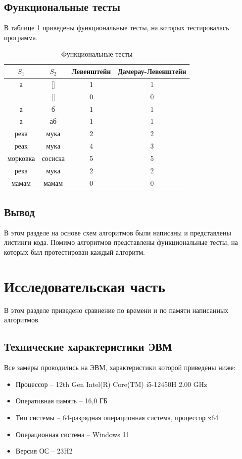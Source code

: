 \documentclass{article}
\begin{document}
\clearpage\subsection{Функциональные тесты}
В таблице \ref{tbl:func_test} приведены функциональные тесты, на которых тестировалась программа.
\begin{table}[h]
	\begin{center}
	\caption{\label{tbl:func_test} Функциональные тесты}
	\begin{tabular}{|c|c|c|c|}
		\hline
		$S_{1}$ & $S_{2}$ & Левенштейн &  Дамерау-Левенштейн
		\\ \hline
		а & [] & 1 & 1  
		\\ \hline
		[] & [] & 0 & 0                             
		\\ \hline
		а & б & 1 & 1 
		\\ \hline
		а & аб & 1 & 1 
		\\ \hline
		река & мука & 2 & 2 
		\\ \hline
		реак & мука & 4 & 3 
		\\ \hline
		морковка & сосиска & 5 & 5 
		\\ \hline
		река & мука & 2 & 2 
		\\ \hline
		мамам & мамам & 0 & 0 
		\\ \hline
	\end{tabular}
	\end{center}
\end{table}

\subsection{Вывод}
В этом разделе на основе схем алгоритмов были написаны и представлены листинги кода. Помимо алгоритмов
представлены функциональные тесты, на которых был протестирован каждый алгоритм.


\clearpage\section{Исследовательская часть}
В этом разделе приведено сравнение по времени и по памяти написанных алгоритмов.

\subsection{Технические характеристики ЭВМ}
Все замеры проводились на ЭВМ, характеристики которой приведены ниже:
\begin{itemize}
	\item Процессор -- 12th Gen Intel(R) Core(TM) i5-12450H   2.00 GHz
	\item Оперативная память -- 16,0 ГБ
	\item Тип системы -- 64-разрядная операционная система, процессор x64
	\item Операционная система -- Windows 11
	\item Версия ОС -- 23H2
\end{itemize}
\end{document}

